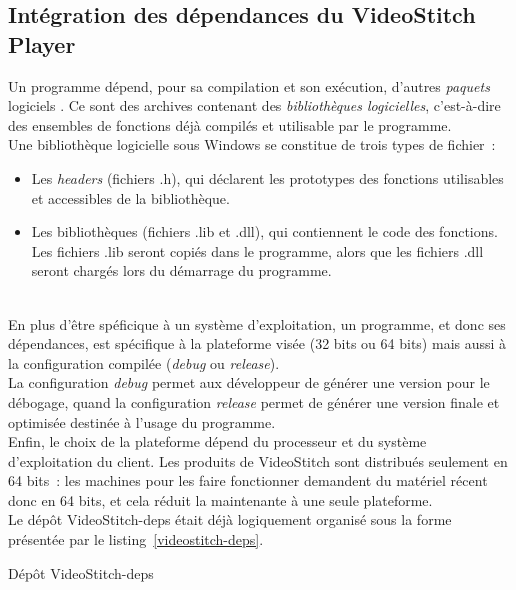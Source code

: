 \subsection{Intégration des dépendances du VideoStitch Player}
\label{integration-dependances-player}
Un programme dépend, pour sa compilation et son exécution, d'autres \emph{paquets} logiciels
\cite{dependance-logicielle}. Ce sont des archives contenant des \emph{bibliothèques logicielles},
c'est-à-dire des ensembles de fonctions déjà compilés et utilisable par le programme.\\
Une bibliothèque logicielle sous Windows se constitue de trois types de fichier\cite{bibliotheque-logicielle}~:
\begin{itemize}
  \item Les \textit{headers} (fichiers .h), qui déclarent les prototypes des fonctions utilisables
  et accessibles de la bibliothèque.
  \item Les bibliothèques (fichiers .lib et .dll), qui contiennent le code des fonctions.
  Les fichiers .lib seront copiés dans le programme, alors que les fichiers .dll seront
  chargés lors du démarrage du programme\cite{bibliotheque-logicielle}.
\end{itemize}
\ \\
En plus d'être spéficique à un système d'exploitation, un programme, et donc
ses dépendances, est spécifique à la plateforme visée (32 bits ou 64 bits)\cite{64-bit-computing}
mais aussi à la configuration compilée (\textit{debug} ou \textit{release})\cite{msdn-debug-release}.\\
La configuration \textit{debug} permet aux développeur de générer une version pour le débogage,
quand la configuration \textit{release} permet de générer une version finale et optimisée destinée
à l'usage du programme. \\
Enfin, le choix de la plateforme dépend du processeur et du
système d'exploitation du client. Les produits de VideoStitch sont distribués
seulement en 64 bits~: les machines pour les faire fonctionner demandent du matériel
récent donc en 64 bits, et cela réduit la maintenante à une seule plateforme.\\
\newline
Le dépôt VideoStitch-deps était déjà logiquement organisé sous la forme présentée par le listing~\ref{videostitch-deps}.
\begin{listing}[H]
  \caption{Dépôt VideoStitch-deps}
  \label{videostitch-deps}
\end{listing}
